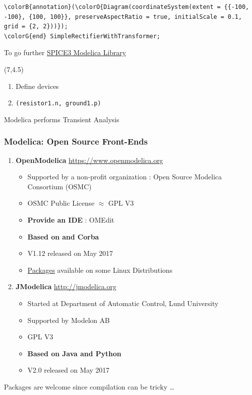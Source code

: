 \begin{frame}[fragile]
\begin{Verbatim}[commandchars=\\\{\}]
  \colorB{annotation}(\colorO{Diagram(coordinateSystem(extent = {{-100, -100}, {100, 100}}, preserveAspectRatio = true, initialScale = 0.1, grid = {2, 2}))});
\colorG{end} SimpleRectifierWithTransformer;
\end{Verbatim}
  \normalsize
  \begin{flushright}
   \tiny%
    To go further \href{https://www.modelica.org/events/modelica2009/Proceedings/memorystick/pages/papers/0019/0019.pdf}{SPICE3 Modelica Library}
  \end{flushright}
  \begin{textblock}{8}(7,4.5)
    \begin{enumerate}
    \item Define devices
    \item \texttt{(resistor1.n, ground1.p)} \\[1em]
    \end{enumerate}
    \attention{} \alert{Modelica performs Transient Analysis}
  \end{textblock}
\end{frame}

\begin{frame}
  \frametitle{Modelica: Open Source Front-Ends}
  \begin{enumerate}
  \item \textbf{OpenModelica} \hfill {\small \url{https://www.openmodelica.org}}
    \begin{itemize}
    \item Supported by a non-profit organization : Open Source Modelica Consortium (OSMC)
    \item OSMC Public License $\approx$ GPL V3
    \item \textbf{Provide an IDE} : OMEdit
    \item \textbf{Based on \Cpp{} and Corba}
    \item V1.12 released on May 2017
    \item \href{https://build.openmodelica.org}{Packages} available on some Linux Distributions \\[1em]
    \end{itemize}
  \item \textbf{JModelica} \hfill {\small \url{http://jmodelica.org}}
    \begin{itemize}
    \item Started at Department of Automatic Control, Lund University
    \item Supported by Modelon AB
    \item GPL V3
    \item \textbf{Based on Java and Python}
    \item V2.0 released on May 2017
    \end{itemize}
  \end{enumerate}
  \centerline{\attention{} \alert{Packages are welcome since compilation can be tricky \ldots}}
\end{frame}

